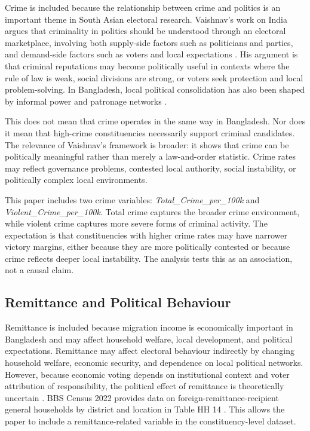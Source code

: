 \documentclass[12pt,a4paper]{article}
\begin{document}
Crime is included because the relationship between crime and politics is an important theme in South Asian electoral research. Vaishnav's work on India argues that criminality in politics should be understood through an electoral marketplace, involving both supply-side factors such as politicians and parties, and demand-side factors such as voters and local expectations \citep{vaishnav2017}. His argument is that criminal reputations may become politically useful in contexts where the rule of law is weak, social divisions are strong, or voters seek protection and local problem-solving. In Bangladesh, local political consolidation has also been shaped by informal power and patronage networks \citep{lewis2022}.

This does not mean that crime operates in the same way in Bangladesh. Nor does it mean that high-crime constituencies necessarily support criminal candidates. The relevance of Vaishnav's framework is broader: it shows that crime can be politically meaningful rather than merely a law-and-order statistic. Crime rates may reflect governance problems, contested local authority, social instability, or politically complex local environments.

This paper includes two crime variables: \textit{Total\_Crime\_per\_100k} and \textit{Violent\_Crime\_per\_100k}. Total crime captures the broader crime environment, while violent crime captures more severe forms of criminal activity. The expectation is that constituencies with higher crime rates may have narrower victory margins, either because they are more politically contested or because crime reflects deeper local instability. The analysis tests this as an association, not a causal claim.

\subsection{Remittance and Political Behaviour}

Remittance is included because migration income is economically important in Bangladesh and may affect household welfare, local development, and political expectations. Remittance may affect electoral behaviour indirectly by changing household welfare, economic security, and dependence on local political networks. However, because economic voting depends on institutional context and voter attribution of responsibility, the political effect of remittance is theoretically uncertain \citep{duch2008,lewisbeck2000,oganesyan2014}. BBS Census 2022 provides data on foreign-remittance-recipient general households by district and location in Table HH 14 \citep{bbs2023}. This allows the paper to include a remittance-related variable in the constituency-level dataset.
\end{document}
